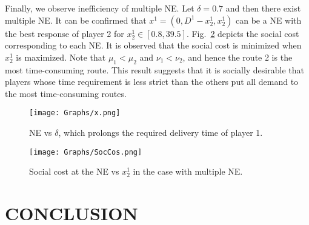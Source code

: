 \documentclass[letterpaper, 10 pt, conference]{ieeeconf}  %
\begin{document}
Finally, we observe inefficiency of multiple NE.
Let $\delta=0.7$ and then there exist multiple NE.
It can be confirmed that $x^1=(0,D^1-x^1_2,x^1_2)$ can be a NE with the best response of player 2 for $x^1_2\in[0.8,39.5]$.
Fig.~\ref{fig:SocCosvsx12} depicts the social cost corresponding to each NE.
It is observed that the social cost is minimized when $x^1_2$ is maximized.
Note that $\mu_1<\mu_2$ and $\nu_1<\nu_2$, and hence the route 2 is the most time-consuming route.
This result suggests that it is socially desirable that players whose time requirement is less strict than the others put all demand to the most time-consuming routes.

\begin{figure}[t]
  \centering
  \texttt{[image: Graphs/x.png]}
  \caption{
   NE vs $\delta$, which prolongs the required delivery time of player 1.
  }
  \label{fig:NEvsdelta}
\end{figure}

\begin{figure}[t]
  \centering
  \texttt{[image: Graphs/SocCos.png]}
  \caption{
  Social cost at the NE vs $x^1_2$ in the case with multiple NE.
  }
  \label{fig:SocCosvsx12}
\end{figure}


\section{CONCLUSION}
\label{sec:conc}
\end{document}
